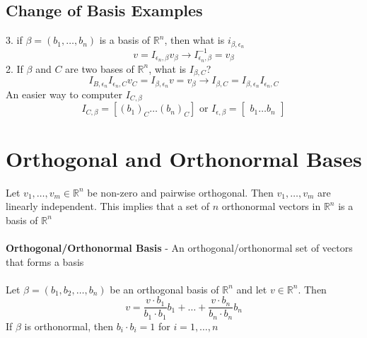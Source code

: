 \begin{enumerate}
\subsection{Change of Basis Examples}
3. if $\beta = (b_1, \dots, b_n)$ is a basis of $\mathbb{R}^n$, then what is $i_{\beta,\epsilon_n}$
\[
  v = I_{\epsilon_n, \beta}v_\beta \rightarrow I^{-1}_{\epsilon_n, \beta} = v_\beta
\]
2. If $\beta$ and $C$ are two bases of $\mathbb{R}^n$, what is $I_{\beta, C}$?
\[
  I_{B,\epsilon_n}I_{\epsilon_n,C}v_C = I_{\beta, \epsilon_n}v = v_\beta \rightarrow I_{\beta, C}
  = I_{\beta, \epsilon_n}I_{\epsilon_n, C}
\]
An easier way to computer $I_{C, \beta}$
\[
  I_{C, \beta} = [(b_1)_C \dots (b_n)_C] \text{ or } I_{\epsilon, \beta} 
  = \begin{bmatrix} b_1 \dots b_n \end{bmatrix}
\]
\section{Orthogonal and Orthonormal Bases}
Let $v_1, \dots, v_m \in \mathbb{R}^n$ be non-zero and pairwise orthogonal. Then $v_1, \dots, v_m$ are 
linearly independent. This implies that a set of $n$ orthonormal vectors in $\mathbb{R}^n$ is a 
basis of $\mathbb{R}^n$ \\\\
\textbf{Orthogonal/Orthonormal Basis} - An orthogonal/orthonormal set of vectors that forms a basis \\\\
Let $\beta = (b_1, b_2, \dots, b_n)$ be an orthogonal basis of $\mathbb{R}^n$ and let 
$v \in \mathbb{R}^n$. Then 
\[
  v = \frac{v \cdot b_1}{b_1 \cdot b_1}b_1 + \dots + \frac{v \cdot b_n}{b_n \cdot b_n}b_n
\]
If $\beta$ is orthonormal, then $b_i \cdot b_i = 1$ for $i = 1, \dots, n$

\end{enumerate}

